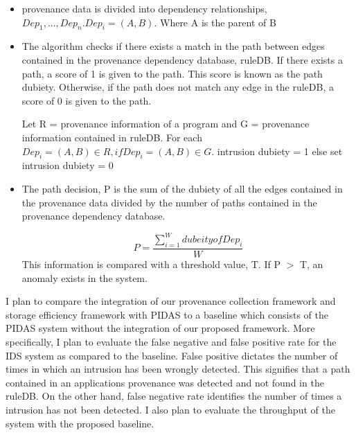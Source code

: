 \begin{itemize}

\item provenance data is divided into dependency relationships, $Dep_1,...,Dep_n. Dep_i =(A, B)$. Where A is the parent of B

\item The algorithm checks if there exists a match in the path between edges contained in the provenance dependency database, ruleDB. If there exists a path, a score of 1 is given to the path. This score is known as the path dubiety. Otherwise, if the path does not match any edge in the ruleDB, a score of 0 is given to the path.

Let R = provenance information of a program and G = provenance information contained in ruleDB. For each $Dep_i = (A, B) \in R, if Dep_i = (A, B) \in G$. intrusion dubiety = 1 else set intrusion dubiety = 0

\item The path decision, P is the sum of the dubiety of all the edges contained in the provenance data divided by the number of paths contained in the provenance dependency database.

 \[P =\frac{\sum\limits_{i=1}^W dubeity of Dep_i }{W} \] This information is compared with a threshold value, T. If P $>$ T, an anomaly exists in the system.

\end{itemize}

I plan to compare the integration of our provenance collection framework and storage efficiency framework with PIDAS to a baseline which consists of the PIDAS system without the integration of our proposed framework. More specifically, I plan to evaluate the false negative and false positive rate for the IDS system as compared to the baseline. False positive dictates the number of times in which an intrusion has been wrongly detected. This signifies that a path contained in an applications provenance was detected and not found in the ruleDB. On the other hand, false negative rate identifies the number of times a intrusion has not been detected. I also plan to evaluate the throughput of the system with the proposed baseline.





%
